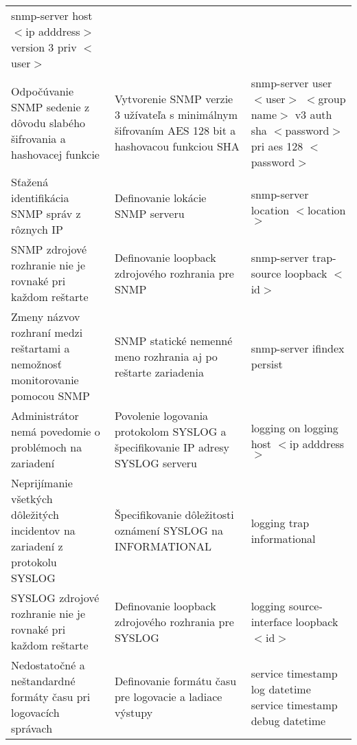 \begin{longtable}[!htbp]{|L{10em}L{10em}>{\selectfont}L{34em}|}
	snmp-server host $<$ip adddress$>$ version 3 priv $<$user$>$\\
	
	
	
	
	 Odpočúvanie SNMP sedenie z dôvodu slabého šifrovania a hashovacej  funkcie	&Vytvorenie SNMP verzie 3 užívateľa s minimálnym šifrovaním AES 128 bit a hashovacou funkciou SHA	&snmp-server user $<$user$>$ $<$group name$>$ v3 auth sha $<$password$>$ pri aes 128 $<$password$>$\\
	
	
	
	
	Sťažená identifikácia SNMP správ z rôznych IP	&Definovanie lokácie SNMP serveru	&snmp-server location $<$location$>$\\
	
	
	
	
	 SNMP zdrojové rozhranie nie je rovnaké pri každom reštarte	& Definovanie loopback zdrojového rozhrania pre SNMP	&snmp-server trap-source loopback $<$id$>$\\
	
	
	
	
	Zmeny názvov rozhraní medzi reštartami a nemožnosť monitorovanie pomocou SNMP	&SNMP statické nemenné meno rozhrania aj po reštarte zariadenia	&snmp-server ifindex persist\\
	
	
	
	
	 Administrátor nemá povedomie o problémoch na zariadení	&Povolenie logovania protokolom SYSLOG a špecifikovanie IP adresy SYSLOG serveru	&logging on
	logging host $<$ip adddress$>$\\
	
	
	
	
	Neprijímanie všetkých dôležitých incidentov na zariadení z protokolu SYSLOG	&Špecifikovanie dôležitosti oznámení SYSLOG na INFORMATIONAL	&logging trap informational\\
	
	
	
	
	 SYSLOG zdrojové rozhranie nie je rovnaké pri každom reštarte	& Definovanie loopback zdrojového rozhrania pre SYSLOG	&logging source-interface loopback $<$id$>$\\
	
	
	
	Nedostatočné a neštandardné formáty času pri logovacích správach	&Definovanie formátu času pre logovacie a ladiace výstupy	&service timestamp log datetime
	service timestamp debug datetime\\
	

\end{longtable}
